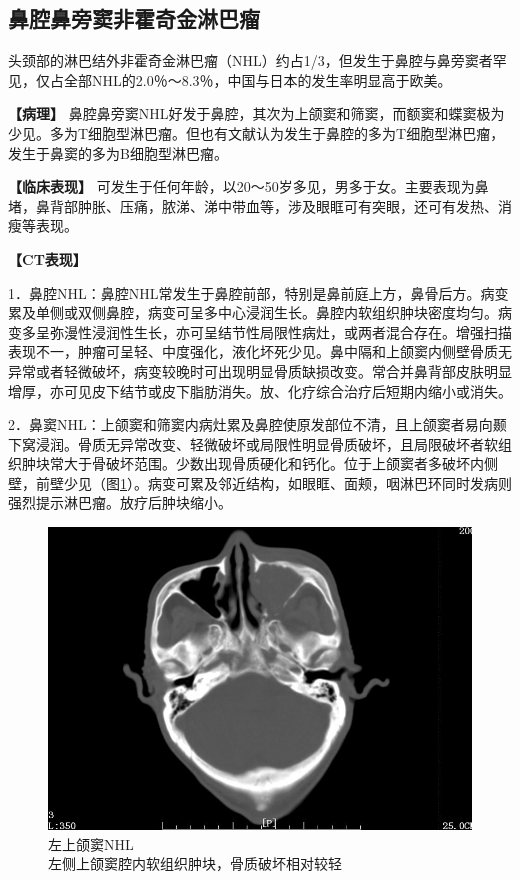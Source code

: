 \subsection{鼻腔鼻旁窦非霍奇金淋巴瘤}

头颈部的淋巴结外非霍奇金淋巴瘤（NHL）约占1/3，但发生于鼻腔与鼻旁窦者罕见，仅占全部NHL的2.0％～8.3％，中国与日本的发生率明显高于欧美。

\textbf{【病理】}
鼻腔鼻旁窦NHL好发于鼻腔，其次为上颌窦和筛窦，而额窦和蝶窦极为少见。多为T细胞型淋巴瘤。但也有文献认为发生于鼻腔的多为T细胞型淋巴瘤，发生于鼻窦的多为B细胞型淋巴瘤。

\textbf{【临床表现】}
可发生于任何年龄，以20～50岁多见，男多于女。主要表现为鼻堵，鼻背部肿胀、压痛，脓涕、涕中带血等，涉及眼眶可有突眼，还可有发热、消瘦等表现。

\textbf{【CT表现】}

1．鼻腔NHL：鼻腔NHL常发生于鼻腔前部，特别是鼻前庭上方，鼻骨后方。病变累及单侧或双侧鼻腔，病变可呈多中心浸润生长。鼻腔内软组织肿块密度均匀。病变多呈弥漫性浸润性生长，亦可呈结节性局限性病灶，或两者混合存在。增强扫描表现不一，肿瘤可呈轻、中度强化，液化坏死少见。鼻中隔和上颌窦内侧壁骨质无异常或者轻微破坏，病变较晚时可出现明显骨质缺损改变。常合并鼻背部皮肤明显增厚，亦可见皮下结节或皮下脂肪消失。放、化疗综合治疗后短期内缩小或消失。

2．鼻窦NHL：上颌窦和筛窦内病灶累及鼻腔使原发部位不清，且上颌窦者易向颞下窝浸润。骨质无异常改变、轻微破坏或局限性明显骨质破坏，且局限破坏者软组织肿块常大于骨破坏范围。少数出现骨质硬化和钙化。位于上颌窦者多破坏内侧壁，前壁少见（图\ref{fig5-11}）。病变可累及邻近结构，如眼眶、面颊，咽淋巴环同时发病则强烈提示淋巴瘤。放疗后肿块缩小。

\begin{figure}[!htbp]
 \centering
 \includegraphics[width=.7\textwidth,height=\textheight,keepaspectratio]{./images/Image00133.jpg}
 \captionsetup{justification=centering}
 \caption{左上颌窦NHL\\{\small 左侧上颌窦腔内软组织肿块，骨质破坏相对较轻}}
 \label{fig5-11}
  \end{figure} 

